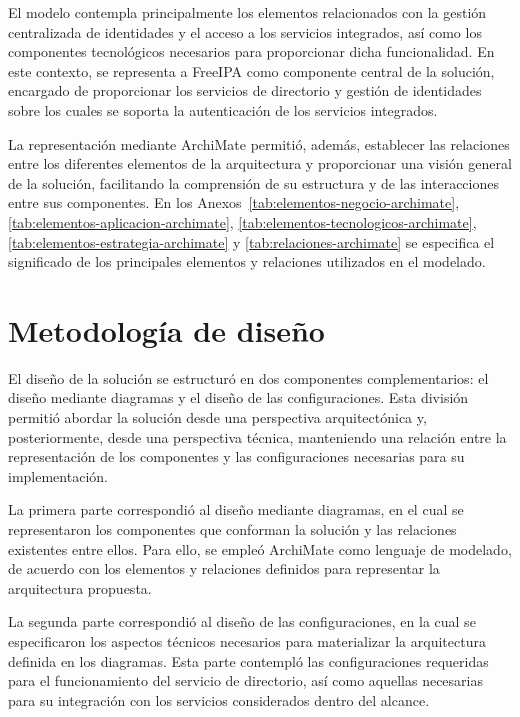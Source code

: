 El modelo contempla principalmente los elementos relacionados con la gestión centralizada de identidades y el acceso a los servicios integrados, así como los componentes tecnológicos necesarios para proporcionar dicha funcionalidad. En este contexto, se representa a FreeIPA como componente central de la solución, encargado de proporcionar los servicios de directorio y gestión de identidades sobre los cuales se soporta la autenticación de los servicios integrados.

La representación mediante ArchiMate permitió, además, establecer las relaciones entre los diferentes elementos de la arquitectura y proporcionar una visión general de la solución, facilitando la comprensión de su estructura y de las interacciones entre sus componentes. En los Anexos~\ref{tab:elementos-negocio-archimate}, \ref{tab:elementos-aplicacion-archimate}, \ref{tab:elementos-tecnologicos-archimate}, \ref{tab:elementos-estrategia-archimate} y \ref{tab:relaciones-archimate} se especifica el significado de los principales elementos y relaciones utilizados en el modelado.

\section{Metodología de diseño}\label{sec:metodologia-diseno}

El diseño de la solución se estructuró en dos componentes complementarios: el diseño mediante diagramas y el diseño de las configuraciones. Esta división permitió abordar la solución desde una perspectiva arquitectónica y, posteriormente, desde una perspectiva técnica, manteniendo una relación entre la representación de los componentes y las configuraciones necesarias para su implementación.

La primera parte correspondió al diseño mediante diagramas, en el cual se representaron los componentes que conforman la solución y las relaciones existentes entre ellos. Para ello, se empleó ArchiMate como lenguaje de modelado, de acuerdo con los elementos y relaciones definidos para representar la arquitectura propuesta.

La segunda parte correspondió al diseño de las configuraciones, en la cual se especificaron los aspectos técnicos necesarios para materializar la arquitectura definida en los diagramas. Esta parte contempló las configuraciones requeridas para el funcionamiento del servicio de directorio, así como aquellas necesarias para su integración con los servicios considerados dentro del alcance.


